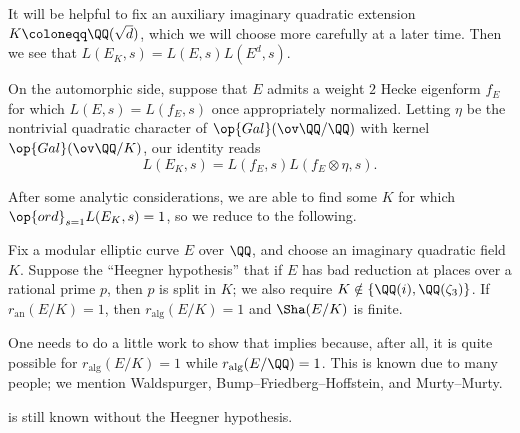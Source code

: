 \documentclass[../notes.tex]{subfiles}
\begin{document}
It will be helpful to fix an auxiliary imaginary quadratic extension $K\coloneqq\QQ(\sqrt d)$, which we will choose more carefully at a later time. Then we see that $L(E_K,s)=L(E,s)L\left(E^d,s\right)$.
\begin{remark}
	On the automorphic side, suppose that $E$ admits a weight $2$ Hecke eigenform $f_E$ for which $L(E,s)=L(f_E,s)$ once appropriately normalized. Letting $\eta$ be the nontrivial quadratic character of $\op{Gal}(\ov\QQ/\QQ)$ with kernel $\op{Gal}(\ov\QQ/K)$, our identity reads
	\[L(E_K,s)=L(f_E,s)L(f_E\otimes\eta,s).\]
\end{remark}
After some analytic considerations, we are able to find some $K$ for which $\op{ord}_{s=1}L(E_K,s)=1$, so we reduce to the following.
\begin{theorem} \label{thm:gzk-over-k}
	Fix a modular elliptic curve $E$ over $\QQ$, and choose an imaginary quadratic field $K$. Suppose the ``Heegner hypothesis'' that if $E$ has bad reduction at places over a rational prime $p$, then $p$ is split in $K$; we also require $K\notin\{\QQ(i),\QQ(\zeta_3)\}$. If $r_{\mathrm{an}}(E/K)=1$, then $r_{\mathrm{alg}}(E/K)=1$ and $\Sha(E/K)$ is finite.
\end{theorem}
\begin{remark}
	One needs to do a little work to show that  implies  because, after all, it is quite possible for $r_{\mathrm{alg}}(E/K)=1$ while $r_{\mathrm{alg}}(E/\QQ)=1$. This is known due to many people; we mention Waldspurger, Bump--Friedberg--Hoffstein, and Murty--Murty.
\end{remark}
\begin{remark}
	 is still known without the Heegner hypothesis.
\end{remark}
\end{document}
